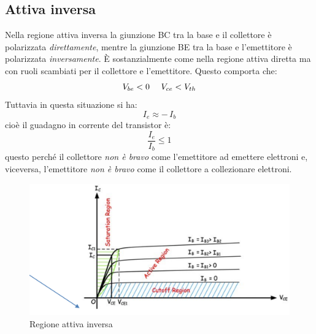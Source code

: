 \documentclass[12pt, a4paper]{report}
\begin{document}
\subsection{Attiva inversa}
Nella regione attiva inversa la giunzione BC tra la base e il collettore è polarizzata \textit{direttamente}, mentre la giunzione BE tra la base e l'emettitore è polarizzata \textit{inversamente}. È sostanzialmente come nella regione attiva diretta ma con ruoli scambiati per il collettore e l'emettitore. Questo comporta che:
\begin{equation*}
    V_{be} < 0 \text{ \, \, } V_{ce} < V_{th}
\end{equation*}
Tuttavia in questa situazione si ha:
\begin{equation}
    I_{e} \approx -\,I_{b}
\end{equation}
cioè il guadagno in corrente del transistor è:
\begin{equation*}
    \frac{I_{e}}{I_{b}} \leq 1
\end{equation*}
questo perché il collettore \textit{non è bravo} come l'emettitore ad emettere elettroni e, viceversa, l'emettitore \textit{non è bravo} come il collettore a collezionare elettroni. 
\begin{figure}[h]
    \centering
    \includegraphics[scale=0.4,angle=0]{bjt_attiva_inversa.png}
    \caption{Regione attiva inversa}
\end{figure}
\end{document}
